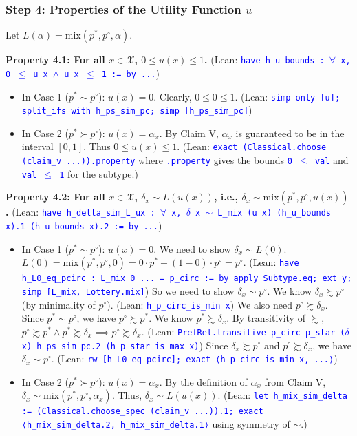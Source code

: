 \documentclass{article}
\theoremstyle{definition}
\newcommand{\X}{\mathcal{X}}
\newcommand{\tactic}[1]{\textcolor{blue}{\texttt{#1}}}
\newcommand{\pref}{\succsim} %
\newcommand{\strictpref}{\succ} %
\newcommand{\indiff}{\sim} %
\newcommand{\mix}{\mathrm{mix}} %
\begin{document}
\subsubsection{Step 4: Properties of the Utility Function $u$}
Let $L(\alpha) = \mix(p^*, p^\circ, \alpha)$.

\textbf{Property 4.1: For all $x \in \X$, $0 \le u(x) \le 1$.}
(Lean: \tactic{have h\_u\_bounds : $\forall$ x, 0 $\leq$ u x $\wedge$ u x $\leq$ 1 := by ...})
\begin{itemize}
    \item In Case 1 ($p^* \indiff p^\circ$): $u(x) = 0$. Clearly, $0 \le 0 \le 1$.
    (Lean: \tactic{simp only [u]; split\_ifs with h\_ps\_sim\_pc; simp [h\_ps\_sim\_pc]})
    \item In Case 2 ($p^* \strictpref p^\circ$): $u(x) = \alpha_x$. By Claim V, $\alpha_x$ is guaranteed to be in the interval $[0,1]$. Thus $0 \le u(x) \le 1$.
    (Lean: \tactic{exact (Classical.choose (claim\_v ...)).property} where \tactic{.property} gives the bounds \tactic{0 $\leq$ val} and \tactic{val $\leq$ 1} for the subtype.)
\end{itemize}

\textbf{Property 4.2: For all $x \in \X$, $\delta_x \indiff L(u(x))$, i.e., $\delta_x \indiff \mix(p^*, p^\circ, u(x))$.}
(Lean: \tactic{have h\_delta\_sim\_L\_ux : $\forall$ x, $\delta$ x $\sim$ L\_mix (u x) (h\_u\_bounds x).1 (h\_u\_bounds x).2 := by ...})
\begin{itemize}
    \item In Case 1 ($p^* \indiff p^\circ$): $u(x) = 0$. We need to show $\delta_x \indiff L(0)$.
    $L(0) = \mix(p^*, p^\circ, 0) = 0 \cdot p^* + (1-0) \cdot p^\circ = p^\circ$.
    (Lean: \tactic{have h\_L0\_eq\_pcirc : L\_mix 0 ... = p\_circ := by apply Subtype.eq; ext y; simp [L\_mix, Lottery.mix]})
    So we need to show $\delta_x \indiff p^\circ$.
    We know $\delta_x \pref p^\circ$ (by minimality of $p^\circ$). (Lean: \tactic{h\_p\_circ\_is\_min x})
    We also need $p^\circ \pref \delta_x$. Since $p^* \indiff p^\circ$, we have $p^\circ \pref p^*$. We know $p^* \pref \delta_x$. By transitivity of $\pref$, $p^\circ \pref p^* \land p^* \pref \delta_x \implies p^\circ \pref \delta_x$.
    (Lean: \tactic{PrefRel.transitive p\_circ p\_star ($\delta$ x) h\_ps\_sim\_pc.2 (h\_p\_star\_is\_max x)})
    Since $\delta_x \pref p^\circ$ and $p^\circ \pref \delta_x$, we have $\delta_x \indiff p^\circ$.
    (Lean: \tactic{rw [h\_L0\_eq\_pcirc]; exact ⟨h\_p\_circ\_is\_min x, ...⟩})
    \item In Case 2 ($p^* \strictpref p^\circ$): $u(x) = \alpha_x$. By the definition of $\alpha_x$ from Claim V, $\delta_x \indiff \mix(p^*, p^\circ, \alpha_x)$. Thus, $\delta_x \indiff L(u(x))$.
    (Lean: \tactic{let h\_mix\_sim\_delta := (Classical.choose\_spec (claim\_v ...)).1; exact ⟨h\_mix\_sim\_delta.2, h\_mix\_sim\_delta.1⟩} using symmetry of $\indiff$.)
\end{itemize}
\end{document}
